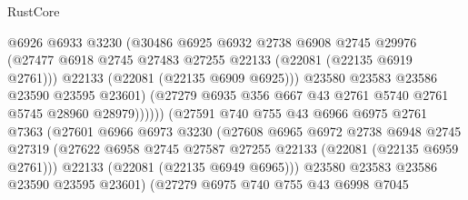 \begin{lexlean}{RustCore}
\begin{coremodule}
                                @6926
                                @6933
                                @3230
                                (@30486
                                  @6925
                                  @6932
                                  @2738
                                  @6908
                                  @2745
                                  @29976
                                  (@27477
                                    @6918
                                    @2745
                                    @27483
                                    @27255
                                    @22133
                                    (@22081 (@22135 @6919 @2761)))
                                  @22133
                                  (@22081 (@22135 @6909 @6925)))
                                @23580
                                @23583
                                @23586
                                @23590
                                @23595
                                @23601)
                              (@27279
                                @6935
                                @356
                                @667
                                @43
                                @2761
                                @5740
                                @2761
                                @5745
                                @28960
                                @28979))))))
                    (@27591
                      @740
                      @755
                      @43
                      @6966
                      @6975
                      @2761
                      @7363
                      (@27601
                        @6966
                        @6973
                        @3230
                        (@27608
                          @6965
                          @6972
                          @2738
                          @6948
                          @2745
                          @27319
                          (@27622 @6958 @2745 @27587 @27255 @22133 (@22081 (@22135 @6959 @2761)))
                          @22133
                          (@22081 (@22135 @6949 @6965)))
                        @23580
                        @23583
                        @23586
                        @23590
                        @23595
                        @23601)
                      (@27279
                        @6975
                        @740
                        @755
                        @43
                        @6998
                        @7045

\end{coremodule}
\end{lexlean}
